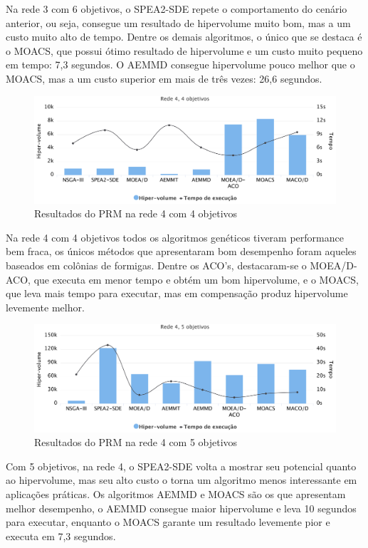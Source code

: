 Na rede 3 com 6 objetivos, o SPEA2-SDE repete o comportamento do cenário anterior, ou seja, consegue um resultado de hipervolume muito bom, mas a um custo muito alto de tempo. Dentre os demais algoritmos, o único que se destaca é o MOACS, que possui ótimo resultado de hipervolume e um custo muito pequeno em tempo: 7,3 segundos. O AEMMD consegue hipervolume pouco melhor que o MOACS, mas a um custo superior em mais de três vezes: 26,6 segundos.

\begin{figure}[!htbp]	
	\includegraphics[width=1\textwidth]{cap_experimentos/figs/etapa4/r4o4}
	\caption{\label{fig_exp4_r4o4}Resultados do PRM na rede 4 com 4 objetivos}
\end{figure}

Na rede 4 com 4 objetivos todos os algoritmos genéticos tiveram performance bem fraca, os únicos métodos que apresentaram bom desempenho foram aqueles baseados em colônias de formigas. Dentre os ACO's, destacaram-se o MOEA/D-ACO, que executa em menor tempo e obtém um bom hipervolume, e o MOACS, que leva mais tempo para executar, mas em compensação produz hipervolume levemente melhor.

\begin{figure}[!htbp]
	\includegraphics[width=1\textwidth]{cap_experimentos/figs/etapa4/r4o5}
	\caption{\label{fig_exp4_r4o5}Resultados do PRM na rede 4 com 5 objetivos}
\end{figure}

Com 5 objetivos, na rede 4, o SPEA2-SDE volta a mostrar seu potencial quanto ao hipervolume, mas seu alto custo o torna um algoritmo menos interessante em aplicações práticas. Os algoritmos AEMMD e MOACS são os que apresentam melhor desempenho, o AEMMD consegue maior hipervolume e leva 10 segundos para executar, enquanto o MOACS garante um resultado levemente pior e executa em 7,3 segundos.

